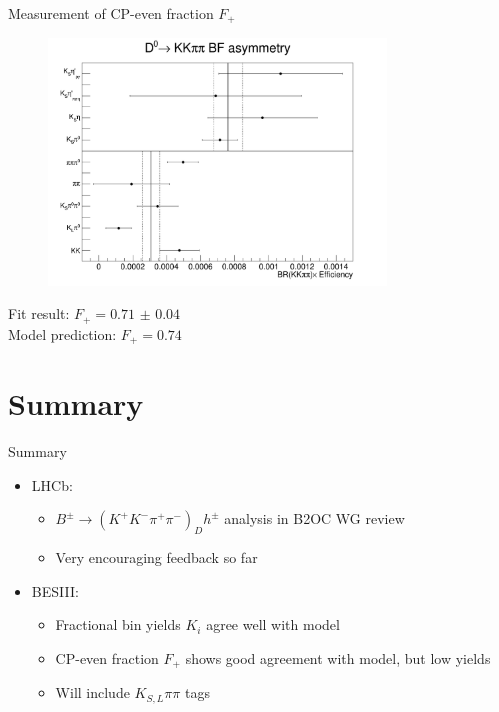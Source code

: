 \documentclass{beamer}
\begin{document}
\begin{frame}{Measurement of CP-even fraction $F_+$}
  \begin{figure}
    \includegraphics[width = 0.80\textwidth]{Plots/CPeven_fraction_combination.png}
  \end{figure}
  \vspace{-0.6cm}
  \begin{center}
    \large Fit result: $F_+ = \SI{0.71(4)}{}$ \\
    \large Model prediction: $F_+ = 0.74$
  \end{center}
\end{frame}

\section{Summary}

\begin{frame}{Summary}
  \begin{itemize}
    \item{LHCb:}
    \begin{itemize}
      \setlength\itemsep{1.5em}
      \item{$B^\pm\to(K^+K^-\pi^+\pi^-)_Dh^\pm$ analysis in B2OC WG review}
      \item{Very encouraging feedback so far}
    \end{itemize}
    \item{BESIII:}
    \begin{itemize}
      \setlength\itemsep{1.5em}
      \item{Fractional bin yields $K_i$ agree well with model}
      \item{CP-even fraction $F_+$ shows good agreement with model, but low yields}
      \item{Will include $K_{S, L}\pi\pi$ tags}
    \end{itemize}
  \end{itemize}
\end{frame}
\end{document}
